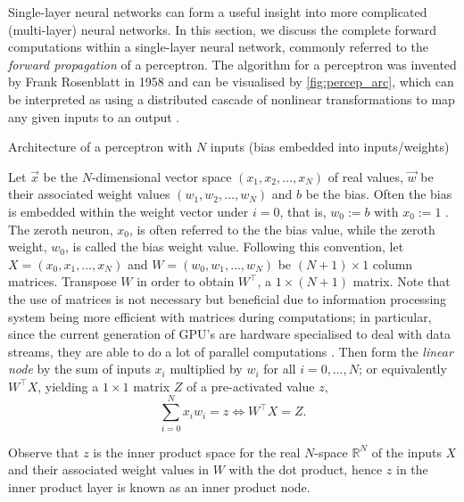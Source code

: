 Single-layer neural networks can form a useful insight into more complicated (multi-layer) neural networks. In this section, we discuss the complete forward computations within a single-layer neural network, commonly referred to the \textit{forward propagation} of a perceptron. The algorithm for a perceptron was invented by Frank Rosenblatt in 1958 and can be visualised by \autoref{fig:percep_arc}, which can be interpreted as using a distributed cascade of nonlinear transformations to map any given inputs to an output \parencite{inbook}.
\begin{figh}
    
    \caption{Architecture of a perceptron with $N$ inputs (bias embedded into inputs/weights)}
    \label{fig:percep_arc}
\end{figh}
Let $\Vec{x}$ be the $N$-dimensional vector space $(x_1, x_2,\dots,x_N)$ of real values, $\Vec{w}$ be their associated weight values $(w_1, w_2,\dots,w_N)$ and $b$ be the bias. Often the bias is embedded within the weight vector under $i=0$, that is, $w_0 := b$ with $x_0:=1$ \parencite[77]{mainbook}. The zeroth neuron, $x_0$, is often referred to the the bias value, while the zeroth weight, $w_0$, is called the bias weight value. Following this convention, let $X=(x_0,x_1,\dots,x_N)$ and $W=(w_0,w_1,\dots,w_N)$ be $(N+1)\times 1$ column matrices. Transpose $W$ in order to obtain $W^{\top}$, a $1 \times (N+1)$ matrix. Note that the use of matrices is not necessary but beneficial due to information processing system being more efficient with matrices during computations; in particular, since the current generation of GPU's are hardware specialised to deal with data streams, they are able to do a lot of parallel computations \parencite{parallel}. Then form the \textit{linear node} by the sum of inputs $x_i$ multiplied by $w_i$ for all $i =0,\dots,N$; or equivalently $W^\top X$, yielding a $1 \times 1$ matrix $Z$ of a pre-activated value $z$,
\begin{equation}
    \sum_{i=0}^N{x_iw_i} = z \iff 
    W^\top X=Z.
    \label{eq:linearcombination}
\end{equation}
\begin{rem}
    Observe that $z$ is the inner product space 
    for the real $N$-space $\mathbb {R}^{N}$ of the inputs $X$ and their associated weight values in $W$ with the dot product, hence $z$ in the inner product layer is known as an inner product node.
\end{rem}
